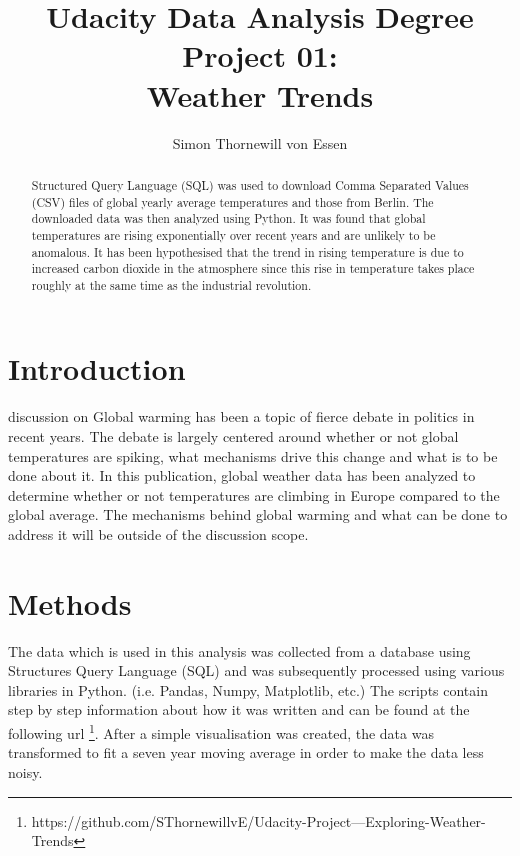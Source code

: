 \documentclass[journal, a4paper]{IEEEtran}
\begin{document}
	\title{Udacity Data Analysis Degree Project 01: \\ Weather Trends}
	\author{Simon Thornewill von Essen}
	\maketitle

\begin{abstract}
	Structured Query Language (SQL)  was used to download Comma Separated Values (CSV) files of global yearly average temperatures and those from Berlin. The downloaded data was then analyzed using Python. It was found that global temperatures are rising exponentially over recent years and are unlikely to be anomalous. It has been hypothesised that the trend in rising temperature is due to increased carbon dioxide in the atmosphere since this rise in temperature takes place roughly at the same time as the industrial revolution.
\end{abstract}

\section{Introduction}
	 discussion on Global warming has been a topic of fierce debate in politics in recent years. The debate is largely centered around whether or not global temperatures are spiking, what mechanisms drive this change and what is to be done about it. In this publication, global weather data has been analyzed to determine whether or not temperatures are climbing in Europe compared to the global average. The mechanisms behind global warming and what can be done to address it will be outside of the discussion scope.
    
	\section{Methods}    
    
    The data which is used in this analysis was collected from a database using Structures Query Language (SQL) and was subsequently processed using various libraries in Python. (i.e. Pandas, Numpy, Matplotlib, etc.) The scripts contain step by step information about how it was written and can be found at the following url \footnote{https://github.com/SThornewillvE/Udacity-Project---Exploring-Weather-Trends}. After a simple visualisation was created, the data was transformed to fit a seven year moving average in order to make the data less noisy.
    
\end{document}
